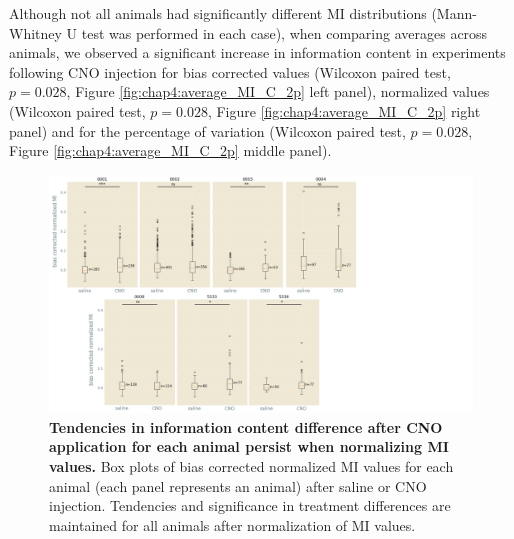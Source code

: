 Although not all animals had significantly different MI distributions (Mann-Whitney U test was performed in each case), when comparing averages across animals, we observed a significant increase in information content in experiments following CNO injection for bias corrected values (Wilcoxon paired test, $p=0.028$, Figure \ref{fig:chap4:average_MI_C_2p} left panel), normalized values (Wilcoxon paired test, $p=0.028$, Figure \ref{fig:chap4:average_MI_C_2p} right panel) and for the percentage of variation (Wilcoxon paired test, $p=0.028$, Figure \ref{fig:chap4:average_MI_C_2p} middle panel).
\begin{figure}[h!]
    \centering
    \includegraphics[trim={0 0 160 0}, clip, width=\textwidth]{Figures/Chapter4/MI_C_norm_all_cells_2p.pdf}
    \caption[Tendencies in information content difference after CNO application for each animal persist when normalizing MI values]{\textbf{Tendencies in information content difference after CNO application for each animal persist when normalizing MI values.} Box plots of bias corrected normalized MI values for each animal (each panel represents an animal) after saline or CNO injection. 
    Tendencies and significance in treatment differences are maintained for all animals after normalization of MI values.}
    \label{fig:chap4:MI_C_norm_2p}
\end{figure}
